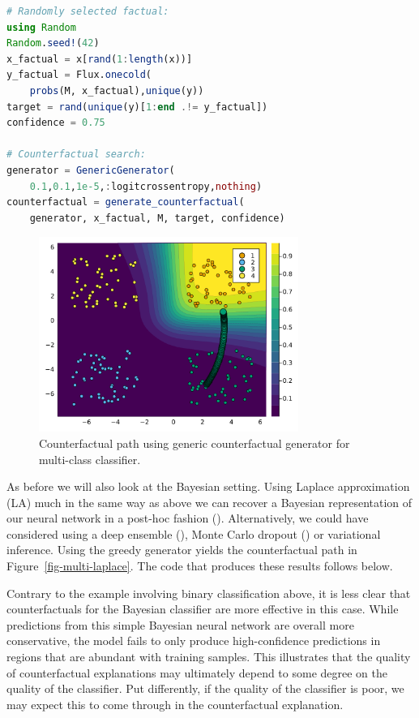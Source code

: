 \documentclass{juliacon}
\begin{document}
\begin{lstlisting}[language = Julia]
# Randomly selected factual:
using Random
Random.seed!(42)
x_factual = x[rand(1:length(x))]
y_factual = Flux.onecold(
    probs(M, x_factual),unique(y))
target = rand(unique(y)[1:end .!= y_factual]) 
confidence = 0.75

# Counterfactual search:
generator = GenericGenerator(
    0.1,0.1,1e-5,:logitcrossentropy,nothing)
counterfactual = generate_counterfactual(
    generator, x_factual, M, target, confidence)
\end{lstlisting}

\begin{figure}

{\centering \includegraphics[width=3.33333in,height=2.5in]{www/ce_multi.png}

}

\caption{\label{fig-multi}Counterfactual path using generic
counterfactual generator for multi-class classifier.}

\end{figure}

As before we will also look at the Bayesian setting. Using Laplace
approximation (LA) much in the same way as above we can recover a
Bayesian representation of our neural network in a post-hoc fashion
(\cite{daxberger2021laplace}). Alternatively, we could have considered
using a deep ensemble (\cite{lakshminarayanan2016simple}), Monte Carlo
dropout (\cite{gal2016dropout}) or variational inference. Using the
greedy generator yields the counterfactual path in
Figure~\ref{fig-multi-laplace}. The code that produces these results
follows below.

Contrary to the example involving binary classification above, it is
less clear that counterfactuals for the Bayesian classifier are more
effective in this case. While predictions from this simple Bayesian
neural network are overall more conservative, the model fails to only
produce high-confidence predictions in regions that are abundant with
training samples. This illustrates that the quality of counterfactual
explanations may ultimately depend to some degree on the quality of the
classifier. Put differently, if the quality of the classifier is poor,
we may expect this to come through in the counterfactual explanation.
\end{document}
